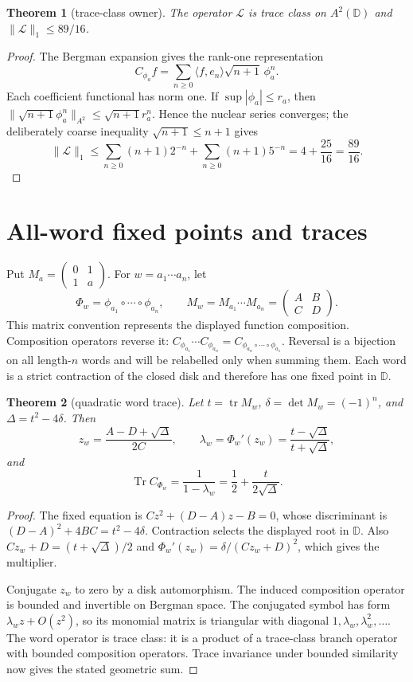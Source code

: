 \documentclass[11pt]{article}
\newtheorem{theorem}{Theorem}
\newcommand{\D}{\mathbb D}
\newcommand{\Lop}{\mathcal L}
\begin{document}
\begin{theorem}[trace-class owner]\label{thm:nuclear}
The operator $\Lop$ is trace class on $A^2(\D)$ and
$\|\Lop\|_1\le89/16$.
\end{theorem}

\begin{proof}
The Bergman expansion gives the rank-one representation
\[
 C_{\phi_a}f=\sum_{n\ge0}\langle f,e_n\rangle
 \sqrt{n+1}\,\phi_a^n.
\]
Each coefficient functional has norm one.  If $\sup|\phi_a|\le r_a$, then
$\|\sqrt{n+1}\phi_a^n\|_{A^2}\le\sqrt{n+1}r_a^n$.
Hence the nuclear series converges; the deliberately coarse inequality
$\sqrt{n+1}\le n+1$ gives
\[
 \|\Lop\|_1\le\sum_{n\ge0}(n+1)2^{-n}
 +\sum_{n\ge0}(n+1)5^{-n}=4+\frac{25}{16}=\frac{89}{16}.
\]
\end{proof}

\section{All-word fixed points and traces}

Put $M_a=\left(\begin{smallmatrix}0&1\\1&a\end{smallmatrix}\right)$.
For $w=a_1\cdots a_n$, let
\[
 \Phi_w=\phi_{a_1}\circ\cdots\circ\phi_{a_n},\qquad
 M_w=M_{a_1}\cdots M_{a_n}=
 \begin{pmatrix}A&B\\C&D\end{pmatrix}.
\]
This matrix convention represents the displayed function composition.
Composition operators reverse it:
$C_{\phi_{a_1}}\cdots C_{\phi_{a_n}}
=C_{\phi_{a_n}\circ\cdots\circ\phi_{a_1}}$.
Reversal is a bijection on all length-$n$ words and will be relabelled only
when summing them.
Each word is a strict contraction of the closed disk and therefore has one
fixed point in $\D$.

\begin{theorem}[quadratic word trace]\label{thm:word}
Let $t=\operatorname{tr}M_w$, $\delta=\det M_w=(-1)^n$, and
$\Delta=t^2-4\delta$.  Then
\[
 z_w=\frac{A-D+\sqrt\Delta}{2C},\qquad
 \lambda_w=\Phi_w'(z_w)=\frac{t-\sqrt\Delta}{t+\sqrt\Delta},
\]
and
\[
 \operatorname{Tr}C_{\Phi_w}=\frac1{1-\lambda_w}
 =\frac12+\frac{t}{2\sqrt\Delta}.
\]
\end{theorem}

\begin{proof}
The fixed equation is $Cz^2+(D-A)z-B=0$, whose discriminant is
$(D-A)^2+4BC=t^2-4\delta$.  Contraction selects the displayed root in
$\D$.  Also $Cz_w+D=(t+\sqrt\Delta)/2$ and
$\Phi_w'(z_w)=\delta/(Cz_w+D)^2$, which gives the multiplier.

Conjugate $z_w$ to zero by a disk automorphism.  The induced composition
operator is bounded and invertible on Bergman space.  The conjugated symbol
has form $\lambda_wz+O(z^2)$, so its monomial matrix is triangular with
diagonal $1,\lambda_w,\lambda_w^2,\ldots$.  The word operator is trace class:
it is a product of a trace-class branch operator with bounded composition
operators.  Trace invariance under bounded similarity now gives the stated
geometric sum.
\end{proof}
\end{document}
